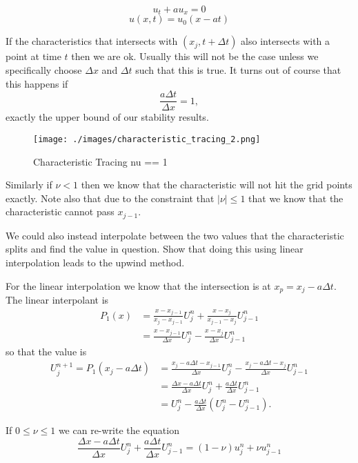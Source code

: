 \documentclass[11pt]{article}
\makeatletter
\def\maxwidth{\ifdim\Gin@nat@width>\linewidth\linewidth
    \else\Gin@nat@width\fi}
\let\Oldincludegraphics\includegraphics
\renewcommand{\includegraphics}[1]{\Oldincludegraphics[width=.8\maxwidth]{#1}}
\makeatother
\begin{document}
 \[ u_t +au_x=0 \] \[u(x,t) = u_0(x-at) \]

    If the characteristics that intersects with \((x_j, t + \Delta t)\) also
intersects with a point at time \(t\) then we are ok. Usually this will
not be the case unless we specifically choose \(\Delta x\) and
\(\Delta t\) such that this is true. It turns out of course that this
happens if \[
    \frac{a \Delta t}{\Delta x} = 1,
\] exactly the upper bound of our stability results.

\begin{figure}
\centering
\texttt{[image: ./images/characteristic\_tracing\_2.png]}
\caption{Characteristic Tracing nu == 1}
\end{figure}

Similarly if \(\nu < 1\) then we know that the characteristic will not
hit the grid points exactly. Note also that due to the constraint that
\(|\nu| \leq 1\) that we know that the characteristic cannot pass
\(x_{j-1}\).

We could also instead interpolate between the two values that the
characteristic splits and find the value in question. Show that doing
this using linear interpolation leads to the upwind method.

    For the linear interpolation we know that the intersection is at
\(x_p = x_j - a \Delta t\). The linear interpolant is \[\begin{aligned}
    P_1(x) &= \frac{x - x_{j-1}}{x_{j} - x_{j-1}} U^n_{j} + \frac{x - x_j}{x_{j-1} - x_j} U^n_{j-1} \\
    & = \frac{x - x_{j-1}}{\Delta x} U^n_{j} - \frac{x - x_j}{\Delta x} U^n_{j-1}
\end{aligned}\] so that the value is \[\begin{aligned}
    U^{n+1}_j = P_1(x_j - a \Delta t) &= \frac{x_j - a \Delta t - x_{j-1}}{\Delta x} U^n_{j} - \frac{x_j - a \Delta t - x_j}{\Delta x} U^n_{j-1} \\
    &= \frac{\Delta x - a \Delta t}{\Delta x} U^n_{j} + \frac{a \Delta t}{\Delta x} U^n_{j-1} \\
    &= U^n_{j} - \frac{a \Delta t}{\Delta x} (U^n_{j} - U^n_{j-1}).
\end{aligned}\]

 If \(0 \leq \nu \leq 1\) we can re-write the equation
\[ \frac{\Delta x - a \Delta t}{\Delta x} U^n_{j} + \frac{a \Delta t}{\Delta x} U^n_{j-1} = (1-\nu)u_j^n+\nu u^n_{j-1}\]
\end{document}
